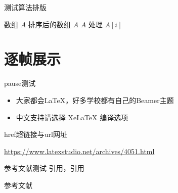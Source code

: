 \begin{frame}{测试算法排版}
  \begin{algorithm}[H]
    \caption{测试算法}
    \begin{algorithmic}[1]
      \Require 数组 $A$
      \Ensure 排序后的数组 $A$
        \State \Return $A$
      \EndIf
        \State 处理 $A[i]$
      \EndFor
    \end{algorithmic}
  \end{algorithm}
\end{frame}




\section{逐帧展示}
\begin{frame}{pause测试}
    \begin{itemize} 
        \item 大家都会\LaTeX{}，好多学校都有自己的Beamer主题 \pause
        \item 中文支持请选择 Xe\LaTeX{} 编译选项
    \end{itemize}
\end{frame}

\begin{frame}{href超链接与url网址}

\href{http://far.tooold.cn/post/latex/beamertsinghua}{\color{purple}{链接}}

\url{https://www.latexstudio.net/archives/4051.html}

\end{frame}



\begin{frame}{参考文献测试}
引用\cite{pwrctv_tgrs2024}，引用\cite{balmf2022_tgrs}
\end{frame}


\begin{frame}[allowframebreaks]{参考文献}
\fontsize{0.0369\PageHeight}{0.0369\PageHeight}\selectfont
\end{frame}





